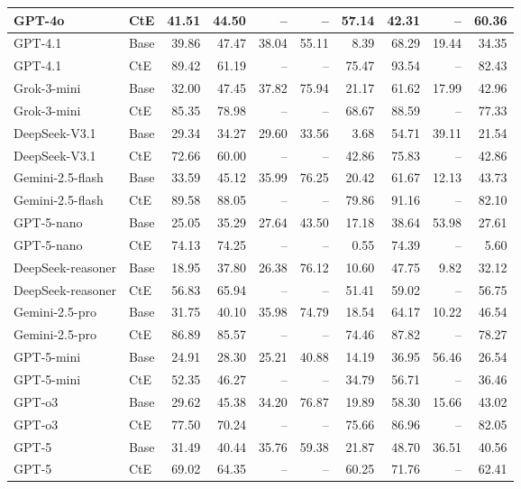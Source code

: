 \begin{table}[!t]
\begin{tabular}{llrrrrrrrr}
GPT-4o & CtE & 41.51 & 44.50 & -- & -- & 57.14 & 42.31 & -- & 60.36 \\
\midrule
GPT-4.1 & Base & 39.86 & 47.47 & 38.04 & 55.11 & 8.39 & 68.29 & 19.44 & 34.35 \\
GPT-4.1 & CtE & 89.42 & 61.19 & -- & -- & 75.47 & 93.54 & -- & 82.43 \\
\midrule
Grok-3-mini & Base & 32.00 & 47.45 & 37.82 & 75.94 & 21.17 & 61.62 & 17.99 & 42.96 \\
Grok-3-mini & CtE & 85.35 & 78.98 & -- & -- & 68.67 & 88.59 & -- & 77.33 \\
\midrule
DeepSeek-V3.1 & Base & 29.34 & 34.27 & 29.60 & 33.56 & 3.68 & 54.71 & 39.11 & 21.54 \\
DeepSeek-V3.1 & CtE & 72.66 & 60.00 & -- & -- & 42.86 & 75.83 & -- & 42.86 \\
\midrule
Gemini-2.5-flash & Base & 33.59 & 45.12 & 35.99 & 76.25 & 20.42 & 61.67 & 12.13 & 43.73 \\
Gemini-2.5-flash & CtE & 89.58 & 88.05 & -- & -- & 79.86 & 91.16 & -- & 82.10 \\
\midrule
GPT-5-nano & Base & 25.05 & 35.29 & 27.64 & 43.50 & 17.18 & 38.64 & 53.98 & 27.61 \\
GPT-5-nano & CtE & 74.13 & 74.25 & -- & -- & 0.55 & 74.39 & -- & 5.60 \\
\midrule
DeepSeek-reasoner & Base & 18.95 & 37.80 & 26.38 & 76.12 & 10.60 & 47.75 & 9.82 & 32.12 \\
DeepSeek-reasoner & CtE & 56.83 & 65.94 & -- & -- & 51.41 & 59.02 & -- & 56.75 \\
\midrule
Gemini-2.5-pro & Base & 31.75 & 40.10 & 35.98 & 74.79 & 18.54 & 64.17 & 10.22 & 46.54 \\
Gemini-2.5-pro & CtE & 86.89 & 85.57 & -- & -- & 74.46 & 87.82 & -- & 78.27 \\
\midrule
GPT-5-mini & Base & 24.91 & 28.30 & 25.21 & 40.88 & 14.19 & 36.95 & 56.46 & 26.54 \\
GPT-5-mini & CtE & 52.35 & 46.27 & -- & -- & 34.79 & 56.71 & -- & 36.46 \\
\midrule
GPT-o3 & Base & 29.62 & 45.38 & 34.20 & 76.87 & 19.89 & 58.30 & 15.66 & 43.02 \\
GPT-o3 & CtE & 77.50 & 70.24 & -- & -- & 75.66 & 86.96 & -- & 82.05 \\
\midrule
GPT-5 & Base & 31.49 & 40.44 & 35.76 & 59.38 & 21.87 & 48.70 & 36.51 & 40.56 \\
GPT-5 & CtE & 69.02 & 64.35 & -- & -- & 60.25 & 71.76 & -- & 62.41 \\
\bottomrule
\end{tabular}
\label{tab:cRi+}
\end{table}

